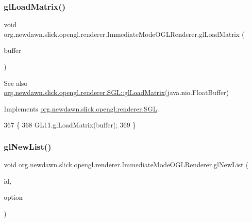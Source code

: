 \subsubsection{\texorpdfstring{gl\+Load\+Matrix()}{glLoadMatrix()}}
{\footnotesize\ttfamily void org.\+newdawn.\+slick.\+opengl.\+renderer.\+Immediate\+Mode\+O\+G\+L\+Renderer.\+gl\+Load\+Matrix (\begin{DoxyParamCaption}\item[{Float\+Buffer}]{buffer }\end{DoxyParamCaption})\hspace{0.3cm}{\ttfamily [inline]}}

\begin{DoxySeeAlso}{See also}
\mbox{\hyperlink{interfaceorg_1_1newdawn_1_1slick_1_1opengl_1_1renderer_1_1_s_g_l_a41baff345ccbf53de61ebb3c77e02914}{org.\+newdawn.\+slick.\+opengl.\+renderer.\+S\+G\+L\+::gl\+Load\+Matrix}}(java.\+nio.\+Float\+Buffer) 
\end{DoxySeeAlso}


Implements \mbox{\hyperlink{interfaceorg_1_1newdawn_1_1slick_1_1opengl_1_1renderer_1_1_s_g_l_a41baff345ccbf53de61ebb3c77e02914}{org.\+newdawn.\+slick.\+opengl.\+renderer.\+S\+GL}}.


\begin{DoxyCode}
367                                                  \{
368         GL11.glLoadMatrix(buffer);
369     \}
\end{DoxyCode}
\mbox{\label{classorg_1_1newdawn_1_1slick_1_1opengl_1_1renderer_1_1_immediate_mode_o_g_l_renderer_a39396e48f77dfffca38c83a01cf865d9}} 
\subsubsection{\texorpdfstring{gl\+New\+List()}{glNewList()}}
{\footnotesize\ttfamily void org.\+newdawn.\+slick.\+opengl.\+renderer.\+Immediate\+Mode\+O\+G\+L\+Renderer.\+gl\+New\+List (\begin{DoxyParamCaption}\item[{int}]{id,  }\item[{int}]{option }\end{DoxyParamCaption})\hspace{0.3cm}{\ttfamily [inline]}}

